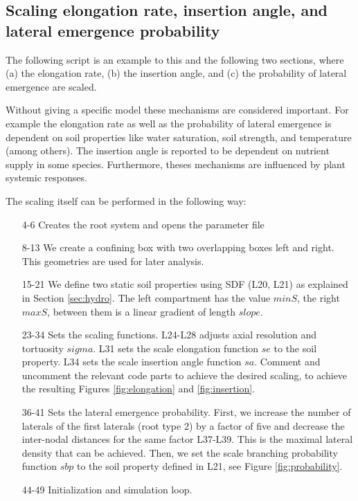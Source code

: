 \documentclass[a4paper]{article}
\begin{document}
\subsection{Scaling elongation rate, insertion angle, and lateral emergence probability} \label{sec:elongation}

The following script is an example to this and the following two sections, where (a) the elongation rate, (b) the insertion angle, and (c) the probability of lateral emergence are scaled.

Without giving a specific model these mechanisms are considered important. 
For example the elongation rate as well as the probability of lateral emergence is dependent on soil properties like water saturation, soil strength, and temperature (among others).  
The insertion angle is reported to be dependent on nutrient supply in some species. Furthermore, theses mechanisms are influenced by plant systemic responses.

The scaling itself can be performed in the following way:



\begin{itemize}

\item[4-6] Creates the root system and opens the parameter file

\item[8-13] We create a confining box with two overlapping boxes left and right. This geometries are used for later analysis.

\item[15-21] We define two static soil properties using SDF (L20, L21) as explained in Section \ref{sec:hydro}. 
The left compartment has the value $minS$, the right $maxS$, between them is a linear gradient of length $slope$.

\item[23-34] Sets the scaling functions. L24-L28 adjusts axial resolution and tortuosity $sigma$. L31 sets the scale elongation function $se$ to the soil property. L34 sets the scale insertion angle function $sa$. 
Comment and uncomment the relevant code parts to achieve the desired scaling, to achieve the resulting Figures \ref{fig:elongation} and \ref{fig:insertion}.

\item[36-41] Sets the lateral emergence probability. 
First, we increase the number of laterals of the first laterals (root type 2) by a factor of five and decrease the inter-nodal distances for the same factor L37-L39. This is the maximal lateral density that can be achieved.
Then, we set the scale branching probability function $sbp$ to the soil property defined in L21, see Figure \ref{fig:probability}.

\item[44-49] Initialization and simulation loop.

\end{itemize}
\end{document}
